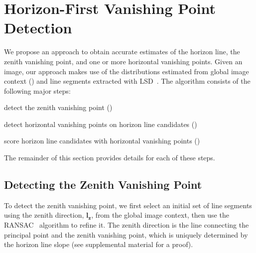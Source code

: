 \section{Horizon-First Vanishing Point Detection}
\label{sec:precise}

We propose an approach to obtain accurate estimates of the horizon
line, the zenith vanishing point, and one or more horizontal vanishing
points. Given an image, our approach makes use of the distributions
estimated from global image context () and
line segments extracted with LSD~\cite{lsd2010}. The algorithm
consists of the following major steps:
\begin{compactenum} %

  \item detect the zenith vanishing point
    ()

  \item \label{alg:findhorvp} detect horizontal vanishing points on
    horizon line candidates
    ()

  \item \label{alg:scorehorizon} score horizon line candidates with
    horizontal vanishing points ()

\end{compactenum}
The remainder of this section provides details for each of these steps.

\subsection{Detecting the Zenith Vanishing Point}
\label{sec:zenithdetection}


To detect the zenith vanishing point, we first select an initial set
of line segments using the zenith direction,
$\mathbf{l}_\mathbf{z}$, from the global image context, then use
the RANSAC~\cite{ransac1981} algorithm to refine it.  The zenith direction
is the line connecting the principal point and the zenith vanishing
point, which is uniquely determined by the horizon line slope (see
supplemental material for a proof).

